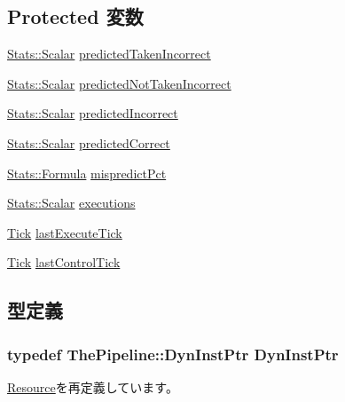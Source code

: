 \subsection*{Protected 変数}
\begin{DoxyCompactItemize}
\item 
\hyperlink{classStats_1_1Scalar}{Stats::Scalar} \hyperlink{classExecutionUnit_aa848feac8bfb4947ca3acb410bfe75c6}{predictedTakenIncorrect}
\item 
\hyperlink{classStats_1_1Scalar}{Stats::Scalar} \hyperlink{classExecutionUnit_ae1cc96638781ca35cb92a5606bd508b7}{predictedNotTakenIncorrect}
\item 
\hyperlink{classStats_1_1Scalar}{Stats::Scalar} \hyperlink{classExecutionUnit_ad540db2d08293b78c8609804d83f97e9}{predictedIncorrect}
\item 
\hyperlink{classStats_1_1Scalar}{Stats::Scalar} \hyperlink{classExecutionUnit_a1cb1bf4a746a7dd06086a839e83d1ef1}{predictedCorrect}
\item 
\hyperlink{classStats_1_1Formula}{Stats::Formula} \hyperlink{classExecutionUnit_a5155e8fb3a34aa84bd812d5ff99d0153}{mispredictPct}
\item 
\hyperlink{classStats_1_1Scalar}{Stats::Scalar} \hyperlink{classExecutionUnit_a9ca9a8e3f9eb86debde9df26107d828d}{executions}
\item 
\hyperlink{base_2types_8hh_a5c8ed81b7d238c9083e1037ba6d61643}{Tick} \hyperlink{classExecutionUnit_a9a1ba2f52fb666bf08047e454e19e05d}{lastExecuteTick}
\item 
\hyperlink{base_2types_8hh_a5c8ed81b7d238c9083e1037ba6d61643}{Tick} \hyperlink{classExecutionUnit_a754fd76d0796936423f7aae0158822f5}{lastControlTick}
\end{DoxyCompactItemize}


\subsection{型定義}
\hypertarget{classExecutionUnit_af9d0c8a46736ba6aa2d8bb94da1a5e73}{
\subsubsection[{DynInstPtr}]{\setlength{\rightskip}{0pt plus 5cm}typedef {\bf ThePipeline::DynInstPtr} {\bf DynInstPtr}}}
\label{classExecutionUnit_af9d0c8a46736ba6aa2d8bb94da1a5e73}


\hyperlink{classResource_af9d0c8a46736ba6aa2d8bb94da1a5e73}{Resource}を再定義しています。


